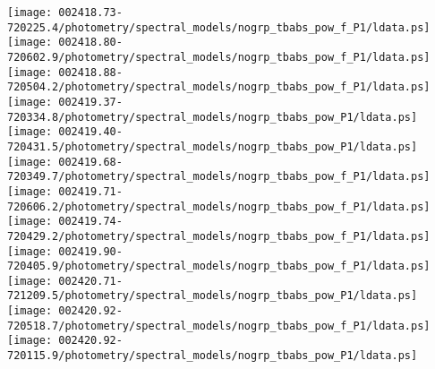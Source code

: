 \documentclass{aastex}
\begin{document}
\begin{figure*}[!ht]
\centering
\texttt{[image: 002418.73-720225.4/photometry/spectral\_models/nogrp\_tbabs\_pow\_f\_P1/ldata.ps]} \hfill 
\texttt{[image: 002418.80-720602.9/photometry/spectral\_models/nogrp\_tbabs\_pow\_f\_P1/ldata.ps]} \hfill 
\texttt{[image: 002418.88-720504.2/photometry/spectral\_models/nogrp\_tbabs\_pow\_f\_P1/ldata.ps]} \\ 
\vspace*{0.5in}
\texttt{[image: 002419.37-720334.8/photometry/spectral\_models/nogrp\_tbabs\_pow\_P1/ldata.ps]} \hfill 
\texttt{[image: 002419.40-720431.5/photometry/spectral\_models/nogrp\_tbabs\_pow\_P1/ldata.ps]} \hfill 
\texttt{[image: 002419.68-720349.7/photometry/spectral\_models/nogrp\_tbabs\_pow\_f\_P1/ldata.ps]} \\ 
\vspace*{0.5in}
\texttt{[image: 002419.71-720606.2/photometry/spectral\_models/nogrp\_tbabs\_pow\_f\_P1/ldata.ps]} \hfill 
\texttt{[image: 002419.74-720429.2/photometry/spectral\_models/nogrp\_tbabs\_pow\_f\_P1/ldata.ps]} \hfill 
\texttt{[image: 002419.90-720405.9/photometry/spectral\_models/nogrp\_tbabs\_pow\_f\_P1/ldata.ps]} \\ 
\vspace*{0.5in}
\texttt{[image: 002420.71-721209.5/photometry/spectral\_models/nogrp\_tbabs\_pow\_P1/ldata.ps]} \hfill 
\texttt{[image: 002420.92-720518.7/photometry/spectral\_models/nogrp\_tbabs\_pow\_f\_P1/ldata.ps]} \hfill 
\texttt{[image: 002420.92-720115.9/photometry/spectral\_models/nogrp\_tbabs\_pow\_P1/ldata.ps]} \\ 
\vspace*{0.5in}
\end{figure*}
\clearpage
\end{document}
